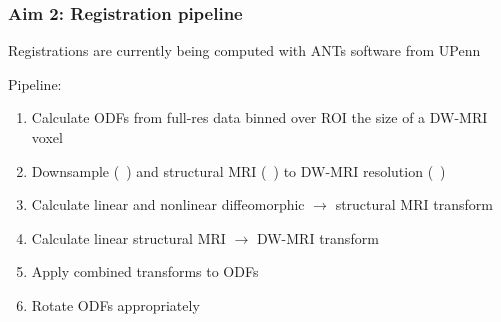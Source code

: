 \documentclass[presentation, 10pt]{beamer}
\begin{document}
\begin{frame}
  \frametitle{Aim 2: Registration pipeline}
  Registrations are currently being computed with ANTs software from UPenn\cite{Avants2014, Klein2009}\newline

  Pipeline:
  \begin{enumerate}
  \item Calculate ODFs from full-res \uct data binned over ROI the size of a DW-MRI voxel
  \item Downsample \uct (~\um) and structural MRI (~\um) to DW-MRI resolution (~\um)
  \item Calculate linear and nonlinear diffeomorphic \cite{Avants2008} \uct $\rightarrow$ structural MRI transform
  \item Calculate linear structural MRI $\rightarrow$ DW-MRI transform
  \item Apply combined transforms to \uct ODFs
  \item Rotate \uct ODFs appropriately\cite{Alexander2001, Raffelt2012, Raffelt2011, Yap2011, Hong2009}
  \end{enumerate}
\end{frame}
\end{document}
